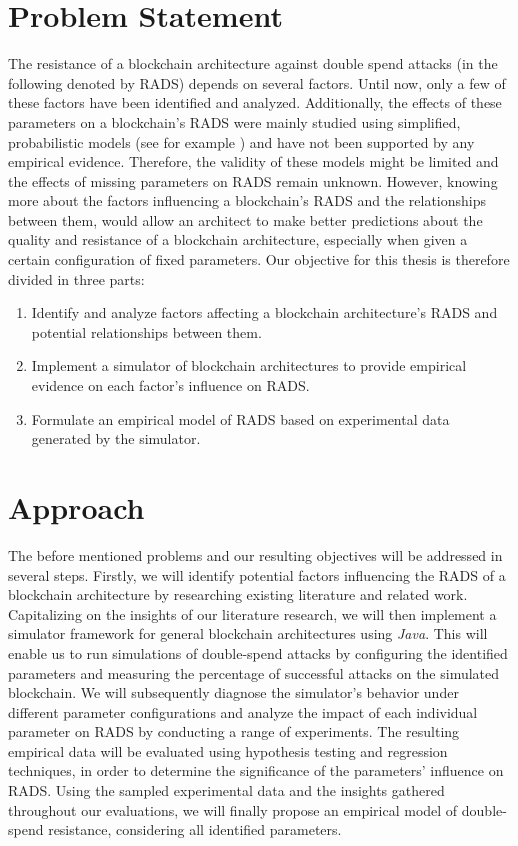 \documentclass[a4paper,12pt,twoside]{report}
\begin{document}
\section{Problem Statement}
The resistance of a blockchain architecture against double spend attacks (in the following denoted by RADS) depends on several factors. Until now, only a few of these factors have been identified and analyzed. Additionally, the effects of these parameters on a blockchain's RADS were mainly studied using simplified, probabilistic models (see for example \cite{nakamoto2008bitcoin,HBDSA}) and have not been supported by any empirical evidence. Therefore, the validity of these models might be limited and the effects of missing parameters on RADS remain unknown. However, knowing more about the factors influencing a blockchain's RADS and the relationships between them, would allow an architect to make better predictions about the quality and resistance of a blockchain architecture, especially when given a certain configuration of fixed parameters. Our objective for this thesis is therefore divided in three parts:
\begin{enumerate}
\item Identify and analyze factors affecting a blockchain architecture's RADS and potential relationships between them.
\item Implement a simulator of blockchain architectures to provide empirical evidence on each factor's influence on RADS.
\item Formulate an empirical model of RADS based on experimental data generated by the simulator. 
\end{enumerate}
\section{Approach}
The before mentioned problems and our resulting objectives will be addressed in several steps. Firstly, we will identify potential factors influencing the RADS of a blockchain architecture by researching existing literature and related work. Capitalizing on the insights of our literature research, we will then implement a simulator framework for general blockchain architectures using \textit{Java}. This will enable us to run simulations of double-spend attacks by configuring the identified parameters and measuring the percentage of successful attacks on the simulated blockchain. We will subsequently diagnose the simulator's behavior under different parameter configurations and analyze the impact of each individual parameter on RADS by conducting a range of experiments. The resulting empirical data will be evaluated using hypothesis testing and regression techniques, in order to determine the significance of the parameters' influence on RADS. Using the sampled experimental data and the insights gathered throughout our evaluations, we will finally propose an empirical model of double-spend resistance, considering all identified parameters.
\end{document}
